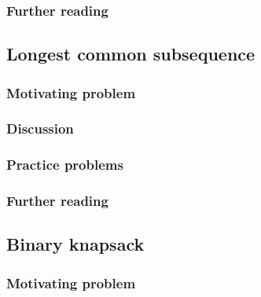 \subsubsection*{Further reading}

\subsection{Longest common subsequence}

\subsubsection*{Motivating problem}







\subsubsection*{Discussion}

\subsubsection*{Practice problems}

\subsubsection*{Further reading}

\subsection{Binary knapsack}

\subsubsection*{Motivating problem}







